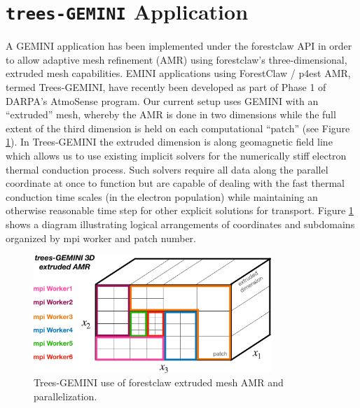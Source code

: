 \documentclass[11pt,letterpaper]{article}
\begin{document}
\section{\texttt{trees-GEMINI} Application} \label{sec:tG}

A GEMINI application has been implemented under the forestclaw API in order to allow adaptive mesh refinement (AMR) using forestclaw's three-dimensional, extruded mesh capabilities.  EMINI applications using ForestClaw / p4est AMR, termed Trees-GEMINI, have recently been developed as part of Phase 1 of DARPA's AtmoSense program.  Our current setup uses GEMINI with an ``extruded'' mesh, whereby the AMR is done in two dimensions while the full extent of the third dimension is held on each computational ``patch'' (see Figure \ref{fig:parallel}).  In Trees-GEMINI the extruded dimension is along geomagnetic field line which allows us to use existing implicit solvers for the numerically stiff electron thermal conduction process.  Such solvers require all data along the parallel coordinate at once to function but are capable of dealing with the fast thermal conduction time scales (in the electron population) while maintaining an otherwise reasonable time step for other explicit solutions for transport.  Figure \ref{fig:parallel} shows a diagram illustrating logical arrangements of coordinates and subdomains organized by mpi worker and patch number.  
\begin{figure}
  \centering
  \includegraphics[width=0.8\textwidth]{./figures/GEMINI_parallel-crop.pdf}
  \caption{Trees-GEMINI use of forestclaw extruded mesh AMR and parallelization.}
  \label{fig:parallel}
\end{figure}
\end{document}
